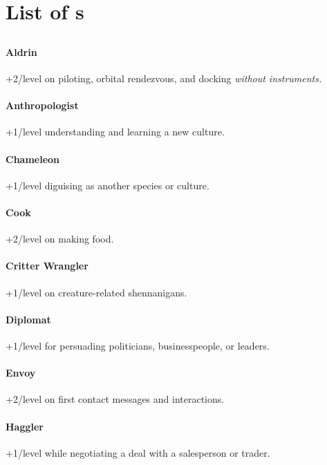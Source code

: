 
\section{List of \skillC s}

\subsection{\feelingsC}

\paragraph{Aldrin}
+2/level on piloting, orbital rendezvous, and docking \textit{without instruments.}

\paragraph{Anthropologist}
+1/level understanding and learning a new culture.

\paragraph{Chameleon}
+1/level diguising as another species or culture.

\paragraph{Cook}
+2/level on making food.

\paragraph{Critter Wrangler}
+1/level on creature-related shennanigans.

\paragraph{Diplomat}
+1/level for persuading politicians, businesspeople, or leaders.

\paragraph{Envoy}
+2/level on first contact messages and interactions.

\paragraph{Haggler}
+1/level while negotiating a deal with a salesperson or trader.

